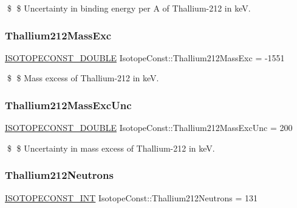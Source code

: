 \$ \$ Uncertainty in binding energy per A of Thallium-\/212 in keV. \mbox{\label{group___isotope_const-_thallium-_tl212_ga3964c0a3d515ee86ae389f59c4e27700}} 
\subsubsection{\texorpdfstring{Thallium212\+Mass\+Exc}{Thallium212MassExc}}
{\footnotesize\ttfamily \mbox{\hyperlink{group___isotope_const-_macros_ga8f45a7272ce02c0b4c65c44636ed719a}{I\+S\+O\+T\+O\+P\+E\+C\+O\+N\+S\+T\+\_\+\+D\+O\+U\+B\+LE}} Isotope\+Const\+::\+Thallium212\+Mass\+Exc = -\/1551}

\$ \$ Mass excess of Thallium-\/212 in keV. \mbox{\label{group___isotope_const-_thallium-_tl212_ga203abf9efe9b2bdfbdf0ae455e7047fd}} 
\subsubsection{\texorpdfstring{Thallium212\+Mass\+Exc\+Unc}{Thallium212MassExcUnc}}
{\footnotesize\ttfamily \mbox{\hyperlink{group___isotope_const-_macros_ga8f45a7272ce02c0b4c65c44636ed719a}{I\+S\+O\+T\+O\+P\+E\+C\+O\+N\+S\+T\+\_\+\+D\+O\+U\+B\+LE}} Isotope\+Const\+::\+Thallium212\+Mass\+Exc\+Unc = 200}

\$ \$ Uncertainty in mass excess of Thallium-\/212 in keV. \mbox{\label{group___isotope_const-_thallium-_tl212_ga57082cc4724c6aa08206168417e239d1}} 
\subsubsection{\texorpdfstring{Thallium212\+Neutrons}{Thallium212Neutrons}}
{\footnotesize\ttfamily \mbox{\hyperlink{group___isotope_const-_macros_ga5f18360b3e99483a35c32d789e62621c}{I\+S\+O\+T\+O\+P\+E\+C\+O\+N\+S\+T\+\_\+\+I\+NT}} Isotope\+Const\+::\+Thallium212\+Neutrons = 131}

